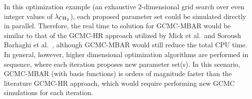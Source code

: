 \documentclass[journal=jced,manuscript=article]{achemso}
\begin{document}
In this optimization example (an exhaustive 2-dimensional grid search over even integer values of $\lambda_{\rm CH_2}$), each proposed parameter set could be simulated directly in parallel. Therefore, the real time to solution for GCMC-MBAR would be similar to that of the GCMC-HR approach utilized by Mick et al.~\cite{Potoff_branched}and Soroush Barhaghi et al.~\cite{Barhaghi2017}, although GCMC-MBAR would still reduce the total CPU time. In general, however, higher dimensional optimization algorithms are performed in sequence, where each iteration proposes new parameter set(s). In this scenario, GCMC-MBAR (with basis functions) is orders of magnitude faster than the literature GCMC-HR approach, which would require performing new GCMC simulations for each iteration.






\end{document}
